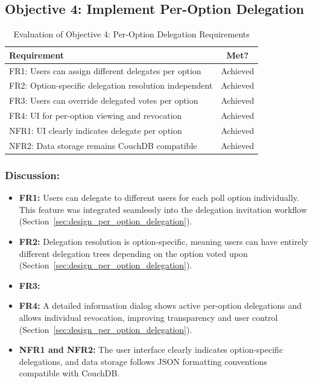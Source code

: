 \subsection{Objective 4: Implement Per-Option Delegation}

\begin{table}[H]
\centering
\begin{tabular}{|p{9cm}|c|}
\hline
\textbf{Requirement} & \textbf{Met?} \\ \hline
FR1: Users can assign different delegates per option & Achieved \\ \hline
FR2: Option-specific delegation resolution independent & Achieved \\ \hline
FR3: Users can override delegated votes per option & Achieved \\ \hline
FR4: UI for per-option viewing and revocation & Achieved \\ \hline
NFR1: UI clearly indicates delegate per option & Achieved \\ \hline
NFR2: Data storage remains CouchDB compatible & Achieved \\ \hline
\end{tabular}
\caption{Evaluation of Objective 4: Per-Option Delegation Requirements}
\label{tab:objective4_requirements}
\end{table}

\subsubsection{Discussion:}

\begin{itemize}
    \item \textbf{FR1:} Users can delegate to different users for each poll option individually. This feature was integrated seamlessly into the delegation invitation workflow (Section~\ref{sec:design_per_option_delegation}).
    \item \textbf{FR2:} Delegation resolution is option-specific, meaning users can have entirely different delegation trees depending on the option voted upon (Section~\ref{sec:design_per_option_delegation}).
    \item \textbf{FR3:} 
    \item \textbf{FR4:} A detailed information dialog shows active per-option delegations and allows individual revocation, improving transparency and user control (Section~\ref{sec:design_per_option_delegation}).
    \item \textbf{NFR1 and NFR2:} The user interface clearly indicates option-specific delegations, and data storage follows JSON formatting conventions compatible with CouchDB.
\end{itemize}

